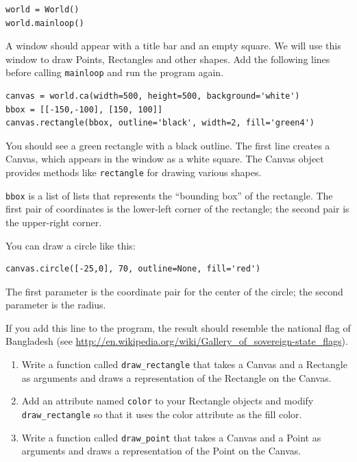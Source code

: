 \documentclass[10pt]{book}
\begin{document}
\begin{CJK}{UTF8}{gbsn}
\begin{exercise}
\begin{verbatim}
world = World()
world.mainloop()
\end{verbatim}

A window should appear with a title bar and an empty square.
We will use this window to draw Points,
Rectangles and other shapes.  
Add the following lines before calling
\verb"mainloop" and run the program again.

\begin{verbatim}
canvas = world.ca(width=500, height=500, background='white')
bbox = [[-150,-100], [150, 100]]
canvas.rectangle(bbox, outline='black', width=2, fill='green4')
\end{verbatim}

You should see a green rectangle with a black outline.
The first line creates a Canvas, which appears in the window
as a white square.  The Canvas object provides methods like
{\tt rectangle} for drawing various shapes.

{\tt bbox} is a list of lists that represents the ``bounding box''
of the rectangle.  The first pair of coordinates is the lower-left
corner of the rectangle; the second pair is the upper-right corner.

You can draw a circle like this:

\begin{verbatim}
canvas.circle([-25,0], 70, outline=None, fill='red')
\end{verbatim}

The first parameter is the coordinate pair for the center of the
circle; the second parameter is the radius.

If you add this line to the program, 
the result should resemble the national flag of Bangladesh
(see \url{http://en.wikipedia.org/wiki/Gallery_of_sovereign-state_flags}).

\begin{enumerate}

\item Write a function called \verb"draw_rectangle" that takes a
  Canvas and a Rectangle as arguments and draws a
  representation of the Rectangle on the Canvas.

\item Add an attribute named {\tt color} to your Rectangle objects and
  modify \verb"draw_rectangle" so that it uses the color attribute as
  the fill color.

\item Write a function called \verb"draw_point" that takes a
  Canvas and a Point as arguments and draws a
  representation of the Point on the Canvas.


\end{enumerate}
\end{exercise}
\end{CJK}
\end{document}
